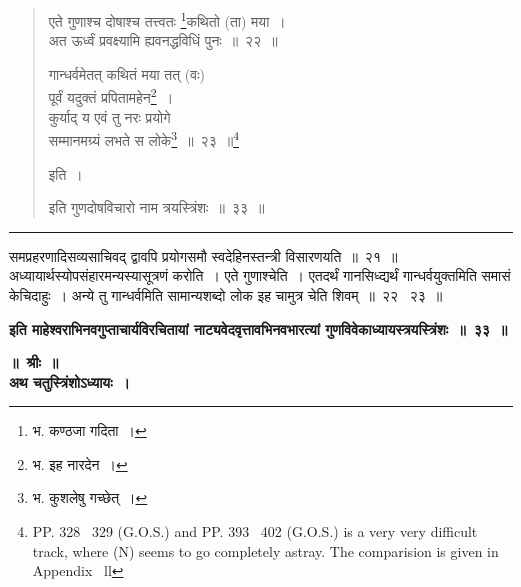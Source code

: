 \documentclass[11pt, openany]{book}
\begin{document}
\begin{quote}
{\na एते गुणाश्च दोषाश्च तत्त्वतः \renewcommand{\thefootnote}{1}\footnote{भ. कण्ठजा गदिता~।}कथितो (ता) मया~।\\
 अत ऊर्ध्वं प्रवक्ष्यामि ह्यवनद्धविधिं पुनः~॥~२२~॥

 गान्धर्वमेतत् कथितं मया तत् (वः)\\
 पूर्वं यदुक्तं प्रपितामहेन\renewcommand{\thefootnote}{2}\footnote{भ. इह नारदेन~।}~।\\
 कुर्याद् य एवं तु नरः प्रयोगे\\
 सम्मानमग्र्यं लभते स लोके\renewcommand{\thefootnote}{3}\footnote{भ. कुशलेषु गच्छेत्~।}~॥~२३~॥\renewcommand{\thefootnote}{*}\footnote{PP. 328  \textendash\ 329 (G.O.S.) and PP. 393  \textendash\  402 (G.O.S.) is a very very difficult track, where (N) seems to go completely astray. The comparision is given in Appendix  \textendash\ ll}}

इति~।

 {\na इति गुणदोषविचारो नाम त्रयस्त्रिंशः~॥~३३~॥}
\end{quote}

\hrule

\vspace{2mm}
समप्रहरणादिसव्यसाचिवद् द्वावपि प्रयोगसमौ स्वदेहिनस्तन्त्री विसारणयति~॥~२१~॥\\

अध्यायार्थस्योपसंहारमन्यस्यासूत्रणं करोति~। एते गुणाश्चेति~। एतदर्थं गानसिध्द्यर्थं गान्धर्वयुक्तमिति समासं केचिदाहुः~। अन्ये तु गान्धर्वमिति सामान्यशब्दो लोक इह चामुत्र चेति शिवम्~॥~२२ \textendash\ २३~॥\\

\begin{center}
\textbf{इति माहेश्वराभिनवगुप्ताचार्यविरचितायां नाट्यवेदवृत्तावभिनवभारत्यां  गुणविवेकाध्यायस्त्रयस्त्रिंशः~॥~३३~॥}
\end{center}

\newpage
{}

\begin{center}
\textbf{\LARGE ॥~श्रीः~॥}\\

\vspace{2mm}
\textbf{\LARGE  अथ चतुस्त्रिंशोऽध्यायः~।}
\end{center}
\end{document}
